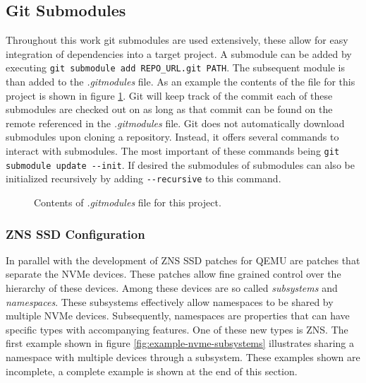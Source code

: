 \documentclass[conference]{IEEEtran}
\newcommand\bashstyle{
	\lstset{
		language=Bash,
		basicstyle=\ttm,
		showstringspaces=false,
		tabsize=2,
		aboveskip=0.2cm,
		belowskip=0.2cm,
		prebreak=\textbackslash,
		extendedchars=true,
		mathescape=false,
		linewidth=8.85cm,
		breaklines=true
	}
}
\newcommand\bashinline[1]{{\bashstyle\lstinline!#1!}}
\newcommand\bashexternal[2][]{{\bashstyle}}
\begin{document}

\subsection{Git Submodules}

Throughout this work git submodules are used extensively, these allow for easy
integration of dependencies into a target project. A submodule can be added by
executing\bashinline{git submodule add REPO_URL.git PATH}. The subsequent
module is than added to the \textit{.gitmodules} file. As an example the
contents of the file for this project is shown in
figure \ref{fig:example-gitmodules}. Git will keep track of the commit each of
these  submodules are checked out on as long as that commit can be found on the
remote referenced in the \textit{.gitmodules} file. Git does not automatically
download  submodules upon cloning a repository. Instead, it offers several
commands to  interact with submodules. The most important of these commands
being\bashinline{git submodule update --init}. If desired the submodules of
submodules can also be initialized recursively by adding\bashinline{--recursive}
to this command.

\begin{center}
	\begin{figure}[H]
		\bashexternal{resources/bash/gitmodules.sh}
		\captionsetup{justification=centering}
		\caption{Contents of \textit{.gitmodules} file for this project.}
		\label{fig:example-gitmodules}
	\end{figure}
\end{center}

\subsubsection{ZNS SSD Configuration}

In parallel with the development of ZNS SSD patches for QEMU are patches that
separate the NVMe devices. These patches allow fine grained control over the
hierarchy of these devices. Among these devices are so called
\textit{subsystems} and \textit{namespaces}. These subsystems effectively allow
namespaces to be shared by multiple NVMe devices. Subsequently, namespaces are
properties that can have specific types with accompanying features. One of these
new types is ZNS. The first example shown in figure
\ref{fig:example-nvme-subsystems} illustrates sharing a namespace with multiple
devices through a subsystem. These examples shown are incomplete, a complete
example is shown at the end of this section.
\end{document}
